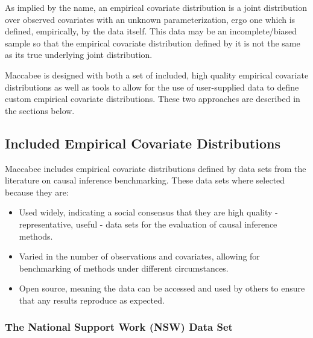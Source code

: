 \documentclass[../main.tex]{subfiles}
\begin{document}
\vspace{\baselineskip}

As implied by the name, an empirical covariate distribution is a joint distribution over observed covariates with an unknown parameterization, ergo one which is defined, empirically, by the data itself. This data may be an incomplete/biased sample so that the empirical covariate distribution defined by it is not the same as its true underlying joint distribution.

\vspace{\baselineskip}

Maccabee is designed with both a set of included, high quality empirical covariate distributions as well as tools to allow for the use of user-supplied data to define custom empirical covariate distributions. These two approaches are described in the sections below.

\subsection{Included Empirical Covariate Distributions}

Maccabee includes empirical covariate distributions defined by data sets from the literature on causal inference benchmarking. These data sets where selected because they are:

\begin{itemize}
    \item Used widely, indicating a social consensus that they are high quality - representative, useful - data sets for the evaluation of causal inference methods.

    \item Varied in the number of observations and covariates, allowing for benchmarking of methods under different circumstances.

    \item Open source, meaning the data can be accessed and used by others to ensure that any results reproduce as expected.
\end{itemize}

\subsubsection{The National Support Work (NSW) Data Set}
\end{document}
